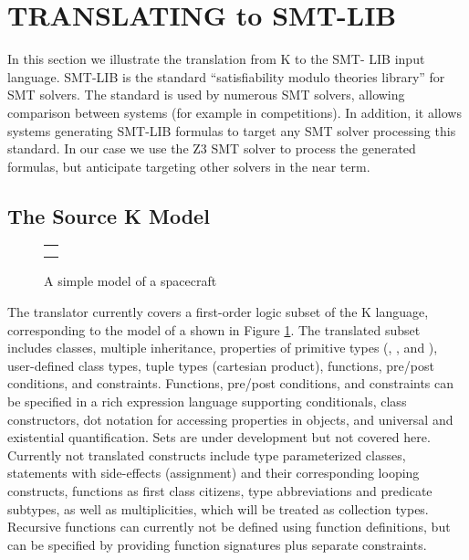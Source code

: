 \section{TRANSLATING \Klang{} to SMT-LIB}
\label{sec:k2smt}

In this section we illustrate the translation from K to the SMT- LIB
input language. SMT-LIB \cite{smt-lib} is the standard
``satisfiability modulo theories library'' for SMT solvers. The
standard is used by numerous SMT solvers, allowing comparison between
systems (for example in competitions).  In addition, it allows systems
generating SMT-LIB formulas to target any SMT solver processing this
standard. In our case we use the Z3 SMT solver \cite{de2008z3} to
process the generated formulas, but anticipate targeting other solvers
in the near term.

\subsection{The Source K Model}

\begin{figure}
\centering
\begin{tabular}{c}
\small
 \\ \\
\end{tabular}
\caption{A simple \Klang{} model of a spacecraft}
\label{fig:spacecraftSmt}
\end{figure}

The translator currently covers a first-order logic subset of the K
language, corresponding to the model of a  shown in
Figure \ref{fig:spacecraftSmt}.
%
The translated subset includes classes, multiple inheritance,
properties of primitive types (, , and
), user-defined class types, tuple types (cartesian
product), functions, pre/post conditions, and constraints.  Functions,
pre/post conditions, and constraints can be specified in a rich
expression language supporting conditionals, class constructors, dot
notation for accessing properties in objects, and universal and
existential quantification.  Sets are under development but not
covered here. Currently not translated constructs include type
parameterized classes, statements with side-effects (assignment) and
their corresponding looping constructs, functions as first class
citizens, type abbreviations and predicate subtypes, as well as
multiplicities, which will be treated as collection types.  Recursive
functions can currently not be defined using function definitions, but
can be specified by providing function signatures plus separate
constraints.

